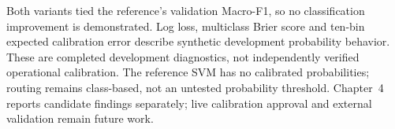 Both variants tied the reference's validation Macro-F1, so no classification improvement is demonstrated. Log loss, multiclass Brier score and ten-bin expected calibration error describe synthetic development probability behavior. These are completed development diagnostics, not independently verified operational calibration. The reference SVM has no calibrated probabilities; routing remains class-based, not an untested probability threshold. Chapter~4 reports candidate findings separately; live calibration approval and external validation remain future work.
